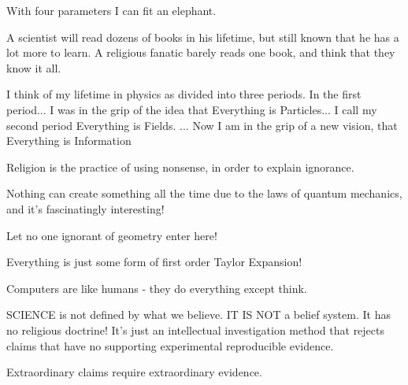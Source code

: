  	\begin{fuquote}With four parameters I can fit an elephant.
 	\end{fuquote}
 	
 	\begin{fuquote}[?]A scientist will read dozens of books in his lifetime, but still known that he has a lot more to learn. A religious fanatic barely reads one book, and think that they know it all.
 	\end{fuquote}
 	
 	\begin{fuquote}I think of my lifetime in physics as divided into three periods. In the first period... I was in the grip of the idea that Everything is Particles... I call my second period Everything is Fields. ... Now I am in the grip of a new vision, that Everything is Information 
 	\end{fuquote}
 	
 	\begin{fuquote}[?]Religion is the practice of using nonsense, in order to explain ignorance.
 	\end{fuquote}
 	
 	\begin{fuquote}Nothing can create something all the time due to the laws of quantum mechanics, and it's fascinatingly interesting!
 	\end{fuquote}
 	
 	\begin{fuquote}[Plato]Let no one ignorant of geometry enter here!
 	\end{fuquote}
 	
 	\begin{fuquote}[?]Everything is just some form of first order Taylor Expansion!\end{fuquote}
 	
 	\begin{fuquote}Computers are like humans - they do everything except think.
 	\end{fuquote}
 	
 	\begin{fuquote}[?]SCIENCE is not defined by what we believe. IT IS NOT a belief system. It has no religious doctrine! It's just an intellectual investigation method that rejects claims that have no supporting experimental reproducible evidence.
 	\end{fuquote}
 	
 	\begin{fuquote} Extraordinary claims require extraordinary evidence.
 	\end{fuquote}
 	
